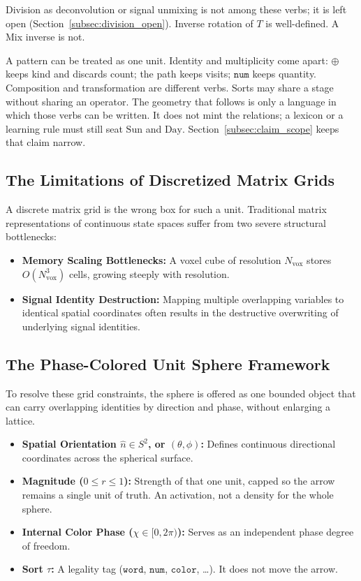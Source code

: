 \documentclass[12pt, a4paper]{article}
\begin{document}
Division as deconvolution or signal unmixing is not among these
verbs; it is left open
(Section~\ref{subsec:division_open}).
Inverse rotation of $T$ is well-defined. A Mix inverse is not.

A pattern can be treated as one unit. Identity and multiplicity come
apart: $\oplus$ keeps kind and discards count; the path keeps visits;
$\mathtt{num}$ keeps quantity. Composition and transformation are
different verbs. Sorts may share a stage without sharing an operator.
The geometry that follows is only a language in which those verbs can
be written. It does not mint the relations; a lexicon or a learning
rule must still seat $\mathrm{Sun}$ and $\mathrm{Day}$.
Section~\ref{subsec:claim_scope} keeps that claim narrow.

\subsection{The Limitations of Discretized Matrix Grids}
A discrete matrix grid is the wrong box for such a unit. Traditional matrix representations of continuous state spaces suffer from two severe structural bottlenecks:
\begin{itemize}
    \item \textbf{Memory Scaling Bottlenecks:} A voxel cube of resolution $N_{\mathrm{vox}}$ stores $O(N_{\mathrm{vox}}^3)$ cells, growing steeply with resolution.
    \item \textbf{Signal Identity Destruction:} Mapping multiple overlapping variables to identical spatial coordinates often results in the destructive overwriting of underlying signal identities.
\end{itemize}

\subsection{The Phase-Colored Unit Sphere Framework}
To resolve these grid constraints, the sphere is offered as one bounded object that can carry overlapping identities by direction and phase, without enlarging a lattice.
\begin{itemize}
    \item \textbf{Spatial Orientation $\hat n \in S^2$, or $(\theta, \phi)$:} Defines continuous directional coordinates across the spherical surface.
    \item \textbf{Magnitude ($0 \leq r \leq 1$):} Strength of that one unit, capped so the arrow remains a single unit of truth. An activation, not a density for the whole sphere.
    \item \textbf{Internal Color Phase ($\chi \in [0, 2\pi)$):} Serves as an independent phase degree of freedom.
    \item \textbf{Sort $\tau$:} A legality tag ($\mathtt{word}$, $\mathtt{num}$, $\mathtt{color}$, \ldots). It does not move the arrow.
\end{itemize}
\end{document}
